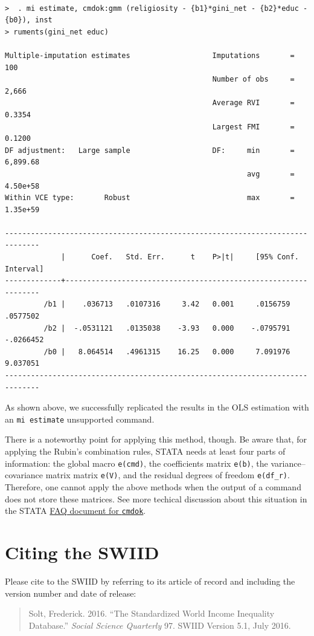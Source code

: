 \documentclass[11pt,]{article}
\theoremstyle{definition}
\theoremstyle{definition}
\theoremstyle{remark}
\begin{document}
\begin{verbatim}

>  . mi estimate, cmdok:gmm (religiosity - {b1}*gini_net - {b2}*educ - {b0}), inst
> ruments(gini_net educ)

Multiple-imputation estimates                   Imputations       =        100
                                                Number of obs     =      2,666
                                                Average RVI       =     0.3354
                                                Largest FMI       =     0.1200
DF adjustment:   Large sample                   DF:     min       =   6,899.68
                                                        avg       =   4.50e+58
Within VCE type:       Robust                           max       =   1.35e+59

------------------------------------------------------------------------------
             |      Coef.   Std. Err.      t    P>|t|     [95% Conf. Interval]
-------------+----------------------------------------------------------------
         /b1 |    .036713   .0107316     3.42   0.001     .0156759    .0577502
         /b2 |  -.0531121   .0135038    -3.93   0.000    -.0795791   -.0266452
         /b0 |   8.064514   .4961315    16.25   0.000     7.091976    9.037051
------------------------------------------------------------------------------
\end{verbatim}

As shown above, we successfully replicated the results in the OLS
estimation with an \texttt{mi\ estimate} unsupported command.

There is a noteworthy point for applying this method, though. Be aware
that, for applying the Rubin's combination rules, STATA needs at least
four parts of information: the global macro \texttt{e(cmd)}, the
coefficients matrix \texttt{e(b)}, the variance--covariance matrix
matrix \texttt{e(V)}, and the residual degrees of freedom
\texttt{e(df\_r)}. Therefore, one cannot apply the above methods when
the output of a command does not store these matrices. See more techical
discussion about this situation in the STATA
\href{http://www.stata.com/support/faqs/statistics/cmdok-option/\#tech}{FAQ
document for \texttt{cmdok}}.

\section{Citing the SWIID}\label{citing-the-swiid}

Please cite to the SWIID by referring to its article of record and
including the version number and date of release:

\begin{quote}
Solt, Frederick. 2016. ``The Standardized World Income Inequality
Database.'' \emph{Social Science Quarterly} 97. SWIID Version 5.1, July
2016.
\end{quote}

\newpage
\singlespacing 

\end{document}
